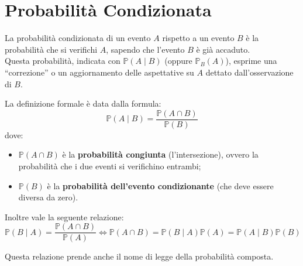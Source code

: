 \section{Probabilità Condizionata}

La probabilità condizionata di un evento $A$ rispetto a un evento $B$ è la probabilità che si verifichi $A$, sapendo che l'evento $B$ è già accaduto.
\\Questa probabilità, indicata con $\mathbb{P}(A \mid B)$ (oppure $\mathbb{P}_B(A)$), esprime una ``correzione'' o un aggiornamento delle aspettative su $A$ dettato dall'osservazione di $B$.

La definizione formale è data dalla formula:
\[
\mathbb{P}(A \mid B) = \frac{\mathbb{P}(A \cap B)}{\mathbb{P}(B)}
\]
dove:
\begin{itemize}
    \item $\mathbb{P}(A \cap B)$ è la \textbf{probabilità congiunta} (l'intersezione), ovvero la probabilità che i due eventi si verifichino entrambi;
    \item $\mathbb{P}(B)$ è la \textbf{probabilità dell'evento condizionante} (che deve essere diversa da zero).
\end{itemize}

Inoltre vale la seguente relazione:
\[
\mathbb{P}(B \mid A) = \frac{\mathbb{P}(A \cap B)}{\mathbb{P}(A)} \iff \mathbb{P}(A \cap B) = \mathbb{P}(B \mid A)\mathbb{P}(A) = \mathbb{P}(A \mid B)\mathbb{P}(B)
\]

Questa relazione prende anche il nome di legge della probabilità composta.

